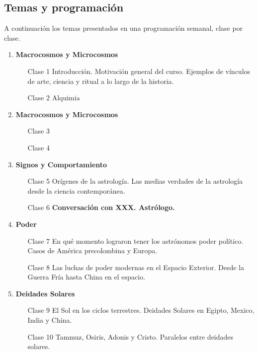 \documentclass{report}
\begin{document}
\subsection*{Temas y programaci\'on}

A continuaci\'on los temas presentados en una programaci\'on semanal,
clase por clase.

\begin{enumerate}
\item {\bf Macrocosmos y Microcosmos}
\begin{itemize}
\item[Clase 1] Introducci\'on. Motivaci\'on general del
  curso. Ejemplos de v\'inculos de arte, ciencia y ritual a lo
  largo de la historia.
\item[Clase 2] Alquimia
\end{itemize}

\item {\bf Macrocosmos y Microcosmos}
\begin{itemize}
\item[Clase 3]
\item[Clase 4]
\end{itemize}

\item {\bf Signos y Comportamiento}
\begin{itemize}
\item[Clase 5] Or\'igenes de la astrolog\'ia. Las medias verdades de
  la astrolog\'ia desde la ciencia contempor\'anea. 
\item[Clase 6] {\bf Conversaci\'on con XXX. Astr\'ologo.}
\end{itemize}

\item {\bf Poder}
\begin{itemize}
\item[Clase 7] En qu\'e momento lograron tener los astr\'onomos poder
  pol\'itico. Casos de Am\'erica precolombina y Europa.
\item[Clase 8] Las luchas de poder modernas en el Espacio
  Exterior. Desde la Guerra Fr\'ia hasta China en el espacio.
\end{itemize}

\item {\bf Deidades Solares}
\begin{itemize}
\item[Clase 9] El Sol en los ciclos terrestres. Deidades Solares en
  Egipto, Mexico, India y China.
\item[Clase 10] Tammuz, Osiris, Adonis y Cristo. Paralelos entre
  deidades solares.
\end{itemize}


\end{enumerate}
\end{document}
